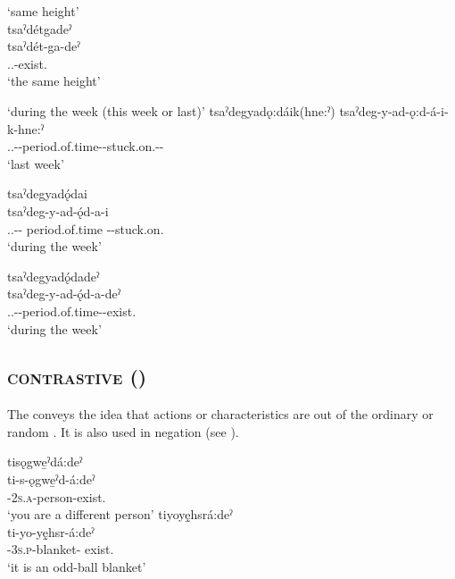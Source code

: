 \ea\label{ex:pppexpressionex30}  ‘same height’\\
tsaˀdétgadeˀ\\
\gll tsaˀdét-ga-deˀ\\
{\coincident.\dualic.\cislocative}-exist.{\stative}\\
\glt `the same height'
\z


\ea\label{ex:pppexpressionex23}  ‘during the week (this week or last)’
\ea tsaˀdegyadǫ:dáik(hne:ˀ)
\gll tsaˀdeg-y-ad-ǫ:d-á-i-k-hne:ˀ\\
{\coincident.\dualic.\cislocative}-{\semireflexive}-period.of.time-{\joinerA}-stuck.on.{\stative}-{\modalizer}-\exsc{\remote}\\
\glt `last week'

\ex tsaˀdegyadǫ́dai\\
\gll tsaˀdeg-y-ad-ǫ́d-a-i\\
{\coincident.\dualic.\cislocative}-{\semireflexive}- period.of.time -{\joinerA}-stuck.on.{\stative}\\
\glt `during the week'

\ex tsaˀdegyadǫ́dadeˀ\\
\gll tsaˀdeg-y-ad-ǫ́d-a-deˀ\\
{\coincident.\dualic.\cislocative}-{\semireflexive}-period.of.time-{\joinerA}-exist.{\stative}\\
\glt `during the week'
\z
\z

\subsection{ \textsc{contrastive} ({\contrastive})} \label{[ti-] (contrastive)}
The  {\contrastive} conveys the idea that actions or characteristics are out of the ordinary or random . It is also used in negation (see ).

\ea\label{ex:tiex}

\ea tisǫgwe̱ˀdá:deˀ\\
\gll ti-s-ǫgwe̱ˀd-á:deˀ\\
{\contrastive}-\textsc{2s.a}-person-exist.{\stative}\\
\glt `you are a different person'
\ex tiyoyę̱hsrá:deˀ \\ 
\gll ti-yo-yę̱hsr-á:deˀ\\
\textsc{\contrastive-3s.p}-blanket- exist.{\stative}\\
\glt ‘it is an odd-ball blanket’

